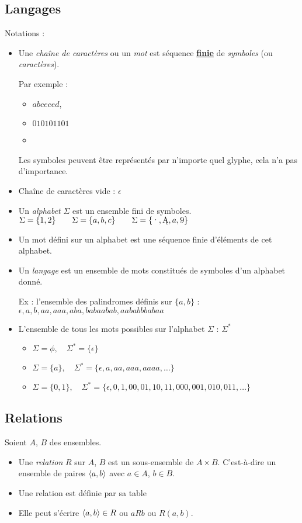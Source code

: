 \subsection{Langages}
\label{subsec:Langages}
Notations :
\begin{itemize}
    \item Une \emph{chaîne de caractères} ou un \emph{mot} est séquence \textbf{\underline{finie}} de \emph{symboles} (ou \emph{caractères}).

    Par exemple :
    	\begin{itemize}
    		\item $abceced$,
    		\item $010101101$
    		\item {}
    	\end{itemize}
    	Les symboles peuvent être représentés par n'importe quel glyphe, cela n'a pas d'importance.
	\item Chaîne de caractères vide : $\epsilon$
    \item Un \emph{alphabet} $\Sigma$ est un ensemble fini de symboles.
    	\subitem $\Sigma = \{1, 2\}\qquad\Sigma = \{a, b, c\}\qquad\Sigma = \{\ding{189},\ding{129},a,9\}$
    \item Un mot défini sur un alphabet est une séquence finie d'éléments de cet alphabet.
    \item Un \emph{langage} est un ensemble de mots constitués de symboles d'un alphabet donné.

    	\subitem Ex : l'ensemble des palindromes définis sur $\{a, b\}$ : $\epsilon, a, b, aa, aaa, aba, babaabab, aababbbabaa$
	\item L'ensemble de tous les mots possibles sur l'alphabet $\Sigma$ :\; $\Sigma^*$
		\begin{itemize}
			\item $\Sigma = \phi,\quad \Sigma^* = \{\epsilon\}$
			\item $\Sigma = \{a\},\quad \Sigma^* = \{\epsilon, a,aa,aaa,aaaa, \ldots\}$
			\item $\Sigma = \{0,1\},\quad \Sigma^* = \{\epsilon, 0,1,00,01,10,11,000,001,010,011, \ldots\}$
		\end{itemize}
\end{itemize}


\subsection{Relations}
\label{subsec:relations}
Soient $A$, $B$ des ensembles.
\begin{itemize}
	\item Une \emph{relation} $R$ sur $A$, $B$ est un sous-ensemble de $A \times B$. C'est-à-dire
		un ensemble de paires $\langle a,b \rangle$ avec $a\in A$, $b\in B$.
	\item Une relation est définie par sa table
	\item Elle peut s'écrire $\langle a,b \rangle \in R$ ou $aR b$ ou $R(a,b)$.
\end{itemize}

